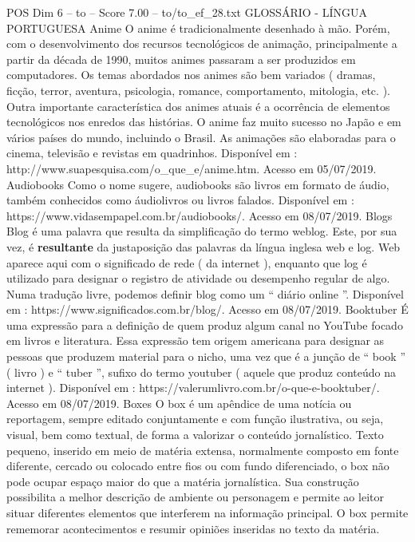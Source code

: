 \begin{textsample}{POS Dim 6 – to – Score 7.00 – to/to\_ef\_28.txt}  \label{ex:f6_pos_176}
GLOSSÁRIO - LÍNGUA PORTUGUESA Anime O anime é tradicionalmente desenhado à mão.
Porém, com o desenvolvimento dos recursos tecnológicos de animação, principalmente a partir da década de 1990, muitos animes passaram a ser produzidos em computadores.
Os temas abordados nos animes são bem variados ( dramas, ficção, terror, aventura, psicologia, romance, comportamento, mitologia, etc. ).
Outra importante característica dos animes atuais é a ocorrência de elementos tecnológicos nos enredos das histórias.
O anime faz muito sucesso no Japão e em vários países do mundo, incluindo o Brasil.
As animações são elaboradas para o cinema, televisão e revistas em quadrinhos.
Disponível em : http://www.suapesquisa.com/o\_que\_e/anime.htm.
Acesso em 05/07/2019.
Audiobooks Como o nome sugere, audiobooks são livros em formato de áudio, também conhecidos como áudiolivros ou livros falados.
Disponível em : https://www.vidasempapel.com.br/audiobooks/.
Acesso em 08/07/2019.
Blogs Blog é uma palavra que resulta da simplificação do termo weblog.
Este, por sua vez, é \textbf{resultante} da justaposição das palavras da língua inglesa web e log.
Web aparece aqui com o significado de rede ( da internet ), enquanto que log é utilizado para designar o registro de atividade ou desempenho regular de algo.
Numa tradução livre, podemos definir blog como um “ diário online ”.
Disponível em : https://www.significados.com.br/blog/.
Acesso em 08/07/2019.
Booktuber É uma expressão para a definição de quem produz algum canal no YouTube focado em livros e literatura.
Essa expressão tem origem americana para designar as pessoas que produzem material para o nicho, uma vez que é a junção de “ book ” ( livro ) e “ tuber ”, sufixo do termo youtuber ( aquele que produz conteúdo na internet ).
Disponível em : https://valerumlivro.com.br/o-que-e-booktuber/.
Acesso em 08/07/2019.
Boxes O box é um apêndice de uma notícia ou reportagem, sempre editado conjuntamente e com função ilustrativa, ou seja, visual, bem como textual, de forma a valorizar o conteúdo jornalístico.
Texto pequeno, inserido em meio de matéria extensa, normalmente composto em fonte diferente, cercado ou colocado entre fios ou com fundo diferenciado, o box não pode ocupar espaço maior do que a matéria jornalística.
Sua construção possibilita a melhor descrição de ambiente ou personagem e permite ao leitor situar diferentes elementos que interferem na informação principal.
O box permite rememorar acontecimentos e resumir opiniões inseridas no texto da matéria.

\end{textsample}
